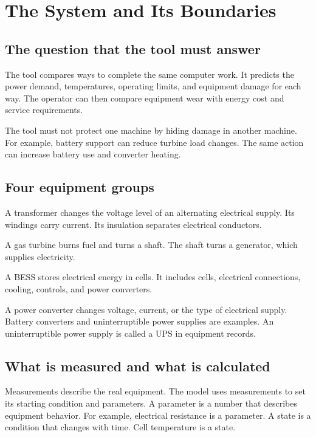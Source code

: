 \documentclass[11pt,a4paper]{report}
\begin{document}
\tableofcontents
\clearpage
{}

\chapter{The System and Its Boundaries}
\label{chap:system}
\section{The question that the tool must answer}
The tool compares ways to complete the same computer work.
It predicts the power demand, temperatures, operating limits, and equipment damage for each way.
The operator can then compare equipment wear with energy cost and service requirements.

The tool must not protect one machine by hiding damage in another machine.
For example, battery support can reduce turbine load changes.
The same action can increase battery use and converter heating.

\section{Four equipment groups}
\begin{description}[style=nextline,leftmargin=0pt]
\item[Transformer] A transformer changes the voltage level of an alternating electrical supply.
Its windings carry current.
Its insulation separates electrical conductors.
\item[Gas turbine] A gas turbine burns fuel and turns a shaft.
The shaft turns a generator, which supplies electricity.
\item[Battery energy storage system, or BESS] A BESS stores electrical energy in cells.
It includes cells, electrical connections, cooling, controls, and power converters.
\item[Power converter] A power converter changes voltage, current, or the type of electrical supply.
Battery converters and uninterruptible power supplies are examples.
An uninterruptible power supply is called a UPS in equipment records.
\end{description}

\section{What is measured and what is calculated}
Measurements describe the real equipment.
The model uses measurements to set its starting condition and parameters.
A parameter is a number that describes equipment behavior.
For example, electrical resistance is a parameter.
A state is a condition that changes with time.
Cell temperature is a state.
\end{document}
